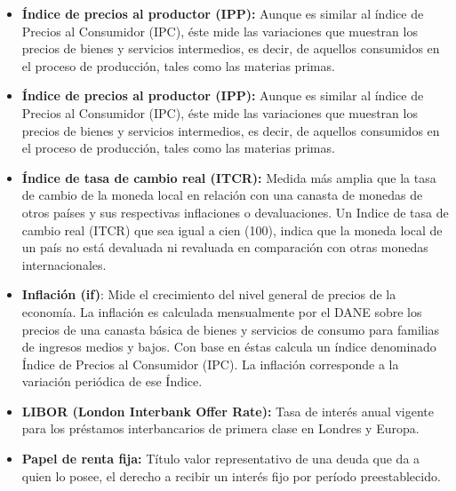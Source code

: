 \begin{itemize}
	\item{\textbf{Índice de precios al productor (IPP): }}
	      Aunque es similar al índice de Precios al Consumidor (IPC), éste mide las variaciones que muestran los precios de bienes y servicios intermedios, es decir, de aquellos consumidos en el proceso de producción, tales como las materias primas.
	      
	\item{\textbf{Índice de precios al productor (IPP): }}
	      Aunque es similar al índice de Precios al Consumidor (IPC), éste mide las variaciones que muestran los precios de bienes y servicios intermedios, es decir, de aquellos consumidos en el proceso de producción, tales como las materias primas.\\
	      
	\item {\textbf{Índice de tasa de cambio real (ITCR): }}
	      Medida más amplia que la tasa de cambio de la moneda local en relación con una canasta de monedas de otros países y sus respectivas inflaciones o devaluaciones. Un Indice de tasa de cambio real (ITCR) que sea igual a cien (100), indica que la moneda local de un país no está devaluada ni revaluada en comparación con otras monedas internacionales. \\
	      
	\item {\textbf{Inflación (if)}: }
	      Mide el crecimiento del nivel general de precios de la economía. La inflación es calculada mensualmente por el DANE sobre los precios de una canasta básica de bienes y servicios de consumo para familias de ingresos medios y bajos. Con base en éstas calcula un índice denominado Índice de Precios al Consumidor (IPC). La inflación corresponde a la variación periódica de ese Índice.\\
	      
	      
	\item {\textbf{LIBOR (London Interbank Offer Rate): }}
	      Tasa de interés anual vigente para los préstamos interbancarios de primera clase en Londres y Europa.\\
	      
	\item {\textbf{Papel de renta fija: }}
	      Título valor representativo de una deuda que da a quien lo posee, el derecho a recibir un interés fijo por período preestablecido.
	      

\end{itemize}
